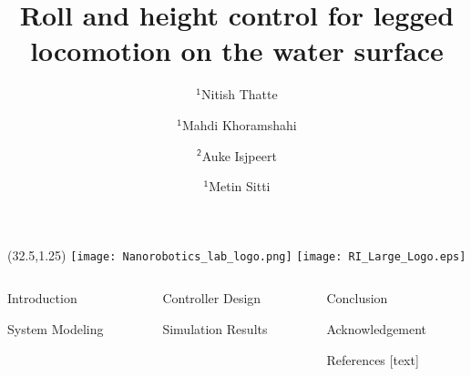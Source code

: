 \documentclass[final]{beamer}
\title{Roll and height control for legged locomotion on the water surface}
\author{$\mathsf{^1}$Nitish Thatte \and $\mathsf{^1}$Mahdi Khoramshahi \and $\mathsf{^2}$Auke Isjpeert \and  $\mathsf{^1}$Metin Sitti}
\institute{$\mathsf{^1}$Carnegie Mellon University \hspace{1EM} $\mathsf{^2}$\'{E}cole Polytechnique F\'{e}d\'{e}rale de Lausanne
}
\begin{document}
\begin{textblock}{12}(32.5,1.25)
    \texttt{[image: Nanorobotics\_lab\_logo.png]} 
    \texttt{[image: RI\_Large\_Logo.eps]}
\end{textblock}

\begin{frame}{} 
    \begin{columns}[t]
        \begin{column}{.3\linewidth}
            \begin{block}{Introduction}
                
            \end{block}
            
            \vspace{1in}
            \begin{block}{System Modeling}
                
            \end{block}
        \end{column}
        \begin{column}{.3\linewidth}
            \begin{block}{Controller Design}
                
            \end{block}
            \begin{block}{Simulation Results}
                
            \end{block}
        \end{column}
        \begin{column}{.3\linewidth}
            \begin{block}{Conclusion}
                
            \end{block}
            \vspace{0.5in}

            \begin{block}{Acknowledgement}
                \small
                
            \end{block}

            \vspace{0.5in}
            \begin{block}{References}
                \small
                [text] 
                
                
            \end{block}
        \end{column}
    \end{columns}
\end{frame}
\end{document}

